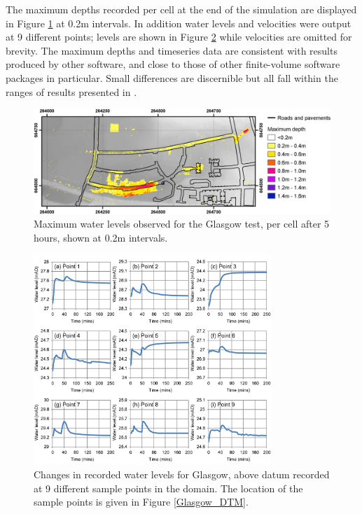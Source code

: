 The maximum depths recorded per cell at the end of the simulation are displayed in Figure \ref{Glasgow_MaxDepths} at 0.2m intervals. In addition water levels and velocities were output at 9 different points; levels are shown in Figure \ref{Glasgow_PointGraphs} while velocities are omitted for brevity. The maximum depths and timeseries data are consistent with results produced by other software, and close to those of other finite-volume software packages in particular. Small differences are discernible but all fall within the ranges of results presented in \citet{Pender2010}.

\begin{figure}[tpb]
\centering
\includegraphics[width=1.0\textwidth]{heterogeneous-dev-figures/Glasgow_MaxDepths.png}
\caption{Maximum water levels observed for the Glasgow test, per cell after 5 hours, shown at 0.2m intervals.}
\label{Glasgow_MaxDepths}
\end{figure}
\begin{figure}[tpb]
\centering
\includegraphics[width=0.8\textwidth]{heterogeneous-dev-figures/Glasgow_PointGraphs.png}
\caption{Changes in recorded water levels for Glasgow, above datum recorded at 9 different sample points in the domain. The location of the sample points is given in Figure \ref{Glasgow_DTM}.}
\label{Glasgow_PointGraphs}
\end{figure}

